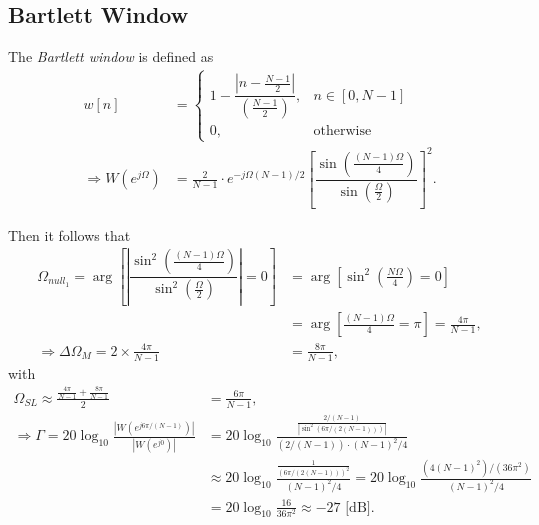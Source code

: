 \documentclass{report}
\begin{document}
\subsection{Bartlett Window}
The \emph{Bartlett window} is defined as 
\begin{align}
    w[n] &= \begin{cases}
        1-\dfrac{\left|n-\frac{N-1}{2}\right|}{\left(\frac{N-1}{2}\right)}, & n\in[0,N-1] \\
        0, & \text{otherwise}
    \end{cases} \\
    \Longrightarrow W(e^{j\Omega}) &= \frac{2}{N-1}\cdot e^{-j\Omega(N-1)/2}\left[\dfrac{\sin\left(\frac{(N-1)\Omega}{4}\right)}{\sin\left(\frac{\Omega}{2}\right)}\right]^2.
\end{align}
\begin{center}
\end{center}
Then it follows that 
\begin{align*}
    \Omega_{null_1} = \arg \left[\left|\dfrac{\sin^2\left(\frac{(N-1)\Omega}{4}\right)}{\sin^2\left(\frac{\Omega}{2}\right)}\right|=0\right] &= \arg \left[\sin^2\left(\frac{N\Omega}{4}\right)=0\right] \\ 
    &= \arg \left[\frac{(N-1)\Omega}{4}=\pi\right] = \frac{4\pi}{N-1}, \\
    \Longrightarrow \Delta\Omega_M = 2 \times \frac{4\pi}{N-1} &= \frac{8\pi}{N-1},
\end{align*}
with 
\begin{align*}
    \Omega_{SL} \approx \frac{\frac{4\pi}{N-1}+\frac{8\pi}{N-1}}{2} &= \frac{6\pi}{N-1}, \\
    \Longrightarrow\Gamma = 20 \log_{10}\frac{|W(e^{j6\pi/(N-1)})|}{|W(e^{j0})|} &= 20\log_{10} \frac{\frac{2/(N-1)}{|\sin^2(6\pi/(2(N-1)))|}}{(2/(N-1))\cdot (N-1)^2/4} \\
    &\approx 20\log_{10} \frac{\frac{1}{(6\pi/(2(N-1)))^2}}{(N-1)^2/4} = 20\log_{10} \frac{(4(N-1)^2)/(36\pi^2)}{(N-1)^2/4} \\ 
    &= 20\log_{10} \frac{16}{36\pi^2} \approx -27 \text{ [dB]}.
\end{align*}
\end{document}
